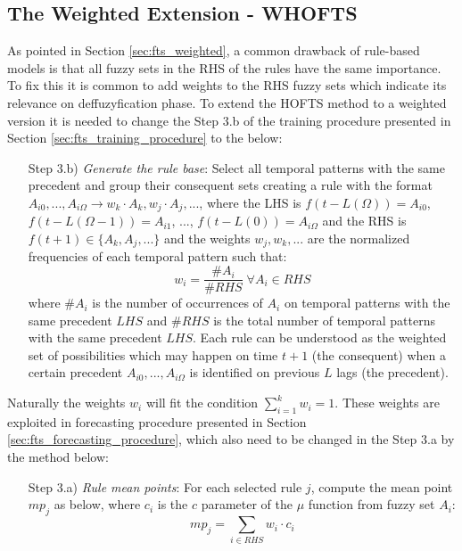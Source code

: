 %
\subsection{The Weighted Extension - WHOFTS}
\label{sec:fts_whofts}

As pointed in Section \ref{sec:fts_weighted}, a common drawback of rule-based models is that all fuzzy sets in the RHS of the rules have the same importance. To fix this it is common to add weights to the RHS fuzzy sets which indicate its relevance on deffuzyfication phase. To extend the HOFTS method to a weighted version it is needed to change the Step 3.b of the training procedure presented in Section \ref{sec:fts_training_procedure} to the below:

\begin{enumerate}
\item[Step 3.b)] \textit{Generate the rule base}: Select all temporal patterns with the same precedent and group their consequent sets  creating a rule with the format $A_{i0},...,A_{i\Omega} \rightarrow w_k \cdot A_k, w_j \cdot A_j,...$, where the LHS is $f(t - L(\Omega)) = A_{i0}$, $f(t - L(\Omega-1)) = A_{i1}$, ..., $f(t - L(0)) = A_{i\Omega}$ and the RHS is $f(t+1) \in \{A_k, A_j,...\}$ and the weights $w_j, w_k, ...$ are the normalized frequencies of each temporal pattern such that:
\begin{equation}
w_i = \frac{\#A_i}{\#RHS}\; \forall A_i \in RHS    
\end{equation}
where $\#A_i$ is the number of occurrences of $A_i$ on temporal patterns with the same precedent $LHS$ and $\#RHS$ is the total number of temporal patterns with the same precedent $LHS$. Each rule can be understood as the weighted set of possibilities which may happen on time $t+1$ (the consequent) when a certain precedent $A_{i0},...,A_{i\Omega}$ is identified on previous $L$ lags (the precedent).
\end{enumerate}

Naturally the weights $w_i$ will fit the condition $\sum_{i=1}^k w_i = 1$. These weights are exploited in forecasting procedure presented in Section \ref{sec:fts_forecasting_procedure}, which also need to be changed in the Step 3.a by the method below:

\begin{enumerate}
\item [Step 3.a)] \textit{Rule mean points}: For each selected rule $j$, compute the mean point $mp_j$ as below, where $c_{i}$ is the $c$ parameter of the $\mu$ function from fuzzy set $A_i$:
\begin{equation}
mp_j = \sum_{i \in RHS} w_i \cdot c_i
\end{equation}
\end{enumerate}

